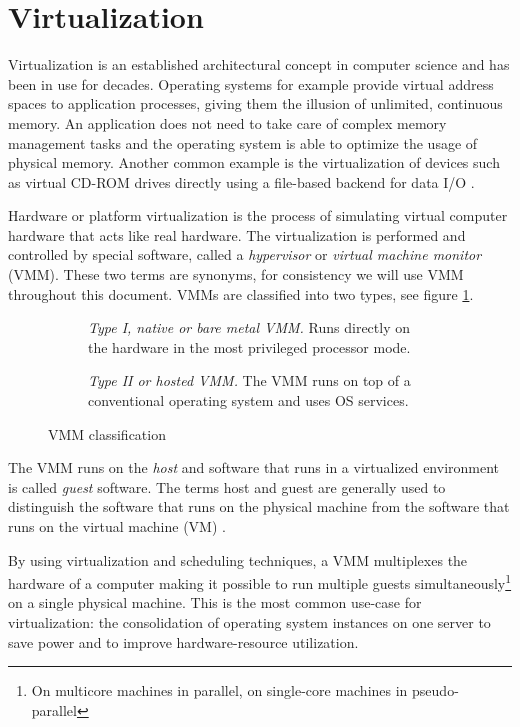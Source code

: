 \section{Virtualization}
Virtualization is an established architectural concept in computer science and
has been in use for decades. Operating systems for example provide virtual
address spaces to application processes, giving them the illusion of unlimited,
continuous memory. An application does not need to take care of complex memory
management tasks and the operating system is able to optimize the usage of
physical memory. Another common example is the virtualization of devices such
as virtual CD-ROM drives directly using a file-based backend for data I/O
\cite{CryptoCloud}.

Hardware or platform virtualization is the process of simulating virtual
computer hardware that acts like real hardware. The virtualization is performed
and controlled by special software, called a
\emph{hypervisor} or \emph{virtual machine monitor}
(VMM). These two terms are synonyms, for consistency we will use VMM
throughout this document. VMMs are classified into two types, see figure
\ref{fig:vmm-classification}.

\begin{figure}
	\centering
	\begin{subfigure}[b]{0.24\textwidth}
		\centering
		
		\caption{\emph{Type I, native or bare metal VMM.} Runs directly on the
		hardware in the most privileged processor mode.}
	\end{subfigure}
	\qquad
	\begin{subfigure}[b]{0.24\textwidth}
		\centering
		
		\caption{\emph{Type II or hosted VMM.} The VMM runs on top of a
		conventional operating system and uses OS services.}
	\end{subfigure}
	\caption{VMM classification}
	\label{fig:vmm-classification}
\end{figure}

The VMM runs on the \emph{host} and software that runs in a virtualized
environment is called \emph{guest} software. The terms host and guest are
generally used to distinguish the software that runs on the physical machine
from the software that runs on the virtual machine (VM)
\cite{wiki:virtualization}.

By using virtualization and scheduling techniques, a VMM multiplexes the
hardware of a computer making it possible to run multiple guests
simultaneously\footnote{On multicore machines in parallel, on single-core
machines in pseudo-parallel} on a single physical machine. This is the most
common use-case for virtualization: the consolidation of operating system
instances on one server to save power and to improve hardware-resource
utilization.

